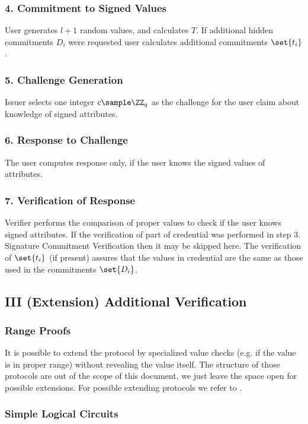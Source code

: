 \subsubsection*{4. Commitment to Signed Values}
User generates $l+1$ random values, and calculates $T$. If additional \textsf{hidden} commitments $D_i$ were requested user calculates additional commitments $\set{t_i}$.

\subsubsection*{5. Challenge Generation}
Issuer selects one integer $c \sample \ZZ_q$ as the challenge for the user claim about knowledge of signed attributes.

\subsubsection*{6. Response to Challenge}
The user computes response only, if the user knows the signed values of attributes.

\subsubsection*{7. Verification of Response}
Verifier performs the comparison of proper values to check if the user knows signed attributes. If the verification of part of credential was performed in step 3. Signature Commitment Verification then it may be skipped here. The verification of $\set{t_i}$ (if present) assures that the values in credential are the same as those used in the commitments $\set{D_i}$.



\subsection*{III (Extension) Additional Verification}

\subsubsection*{Range Proofs}
It is possible to extend the protocol by specialized value checks (e.g. if the value is in proper range) without revealing the value itself. The structure of those protocols are out of the scope of this document, we just leave the space open for possible extensions. For possible extending protocols we refer to \cite{bulletproofs}.

\subsubsection{Simple Logical Circuits}

